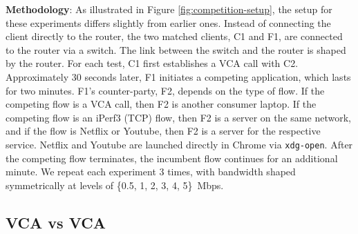 \noindent \textbf{Methodology}: As illustrated in Figure \ref{fig:competition-setup}, the setup for these experiments differs slightly from earlier ones. 
Instead of connecting the client directly to the router, the two matched clients, C1 and F1, are connected to the router via a switch. 
The link between the switch and the router is shaped by the router. For each test, C1 first establishes a VCA call with C2.
Approximately 30 seconds later, F1 initiates a competing application, which lasts for two minutes.
F1's counter-party, F2, depends on the type of flow.
If the competing flow is a VCA call, then F2 is another consumer laptop.
If the competing flow is an iPerf3 (TCP) flow, then F2 is a server on the same network,
  and if the flow is Netflix or Youtube, then F2 is a server for the respective service. Netflix and Youtube are launched directly in Chrome via \texttt{xdg-open}.
After the competing flow terminates, the incumbent flow continues for an additional minute.
We repeat each experiment 3 times, with bandwidth shaped symmetrically at levels of \{0.5, 1, 2, 3, 4, 5\}~Mbps.

\subsection{VCA vs VCA}


